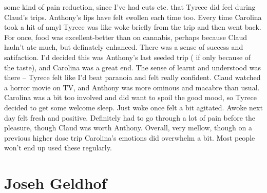 \documentclass[12pt]{book}
\begin{document}
some kind of pain reduction, since I've had cuts etc. that Tyrece did feel during Claud's trips. Anthony's lips have felt swollen each time too. Every time Carolina took a hit of amyl Tyrece was like woke briefly from the trip and then went back. For once, food was excellent-better than on cannabis, perhaps because Claud hadn't ate much, but definately enhanced. There was a sense of success and satifaction. I'd decided this was Anthony's last seeded trip ( if only because of the taste), and Carolina was a great end. The sense of learnt and understood was there -- Tyrece felt like I'd beat paranoia and felt really confident. Claud watched a horror movie on TV, and Anthony was more ominous and macabre than usual. Carolina was a bit too involved and did want to spoil the good mood, so Tyrece decided to get some welcome sleep. Just woke once felt a bit agitated. Awoke next day felt fresh and positive. Definitely had to go through a lot of pain before the pleasure, though Claud was worth Anthony. Overall, very mellow, though on a previous higher dose trip Carolina's emotions did overwhelm a bit. Most people won't end up used these regularly.



\chapter{Joseh Geldhof}
\end{document}
